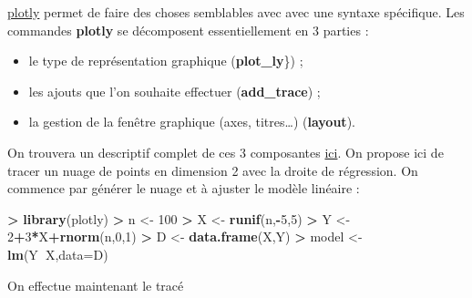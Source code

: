 \documentclass[]{book}
\newenvironment{Shaded}{\begin{snugshade}}{\end{snugshade}}
\newcommand{\DataTypeTok}[1]{\textcolor[rgb]{0.13,0.29,0.53}{#1}}
\newcommand{\DecValTok}[1]{\textcolor[rgb]{0.00,0.00,0.81}{#1}}
\newcommand{\KeywordTok}[1]{\textcolor[rgb]{0.13,0.29,0.53}{\textbf{#1}}}
\newcommand{\NormalTok}[1]{#1}
\newcommand{\OperatorTok}[1]{\textcolor[rgb]{0.81,0.36,0.00}{\textbf{#1}}}
\newcommand{\StringTok}[1]{\textcolor[rgb]{0.31,0.60,0.02}{#1}}
\providecommand{\tightlist}{%
  \setlength{\itemsep}{0pt}\setlength{\parskip}{0pt}}
\theoremstyle{definition}
\theoremstyle{definition}
\theoremstyle{definition}
\theoremstyle{remark}
\begin{document}
\href{https://plot.ly/r/}{plotly} permet de faire des choses semblables avec avec une syntaxe spécifique. Les commandes \textbf{plotly} se décomposent essentiellement en 3 parties :

\begin{itemize}
\tightlist
\item
  le type de représentation graphique (\textbf{plot\_ly}\}) ;
\item
  les ajouts que l'on souhaite effectuer (\textbf{add\_trace}) ;
\item
  la gestion de la fenêtre graphique (axes, titres\ldots{}) (\textbf{layout}).
\end{itemize}

On trouvera un descriptif complet de ces 3 composantes \href{https://plot.ly/r/reference/}{ici}. On propose ici de tracer un nuage de points en dimension 2 avec la droite de régression. On commence par générer le nuage et à ajuster le modèle linéaire :

\begin{Shaded}
\begin{Highlighting}[]
\OperatorTok{>}\StringTok{ }\KeywordTok{library}\NormalTok{(plotly)}
\OperatorTok{>}\StringTok{ }\NormalTok{n <-}\StringTok{ }\DecValTok{100}
\OperatorTok{>}\StringTok{ }\NormalTok{X <-}\StringTok{ }\KeywordTok{runif}\NormalTok{(n,}\OperatorTok{-}\DecValTok{5}\NormalTok{,}\DecValTok{5}\NormalTok{)}
\OperatorTok{>}\StringTok{ }\NormalTok{Y <-}\StringTok{ }\DecValTok{2}\OperatorTok{+}\DecValTok{3}\OperatorTok{*}\NormalTok{X}\OperatorTok{+}\KeywordTok{rnorm}\NormalTok{(n,}\DecValTok{0}\NormalTok{,}\DecValTok{1}\NormalTok{)}
\OperatorTok{>}\StringTok{ }\NormalTok{D <-}\StringTok{ }\KeywordTok{data.frame}\NormalTok{(X,Y)}
\OperatorTok{>}\StringTok{ }\NormalTok{model <-}\StringTok{ }\KeywordTok{lm}\NormalTok{(Y}\OperatorTok{~}\NormalTok{X,}\DataTypeTok{data=}\NormalTok{D)}
\end{Highlighting}
\end{Shaded}

On effectue maintenant le tracé
\end{document}
